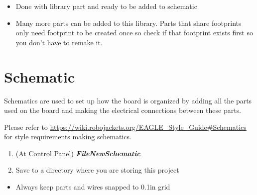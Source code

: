 \documentclass{article}
\begin{document}
\begin{itemize}
    \item Done with library part and ready to be added to schematic
    \item Many more parts can be added to this library. Parts that share footprints only need footprint to be created once so check if that footprint exists first so you don't have to remake it.
\end{itemize}

\section{Schematic}
Schematics are used to set up how the board is organized by adding all the parts used on the board and making the electrical connections between these parts. \par
Please refer to \url{https://wiki.robojackets.org/EAGLE_Style_Guide#Schematics} for style requirements making schematics.
\begin{enumerate}
    \item (At Control Panel) \textit{\textbf{File\textrightarrow New\textrightarrow Schematic}}
    \item Save to a directory where you are storing this project
\end{enumerate}
\begin{tcolorbox} [title=Tips \& Tricks]
    \begin{itemize}
        \item Always keep parts and wires snapped to 0.1in grid
    \end{itemize}
\end{tcolorbox}
\end{document}
